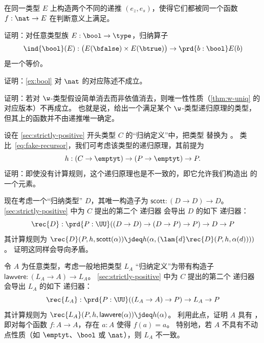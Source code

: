 \begin{ex}\label{ex:one-function-two-recurrences}
  在同一类型 $E$ 上构造两个不同的递推 $(e_z,e_s)$，使得它们都被同一个函数 $f:\nat\to E$ 在判断意义上满足。
\end{ex}

\begin{ex}\label{ex:bool}
  证明：对任意类型族 $E : \bool \to \type$，归纳算子
  \[ \ind{\bool}(E) : \big(E(\bfalse) \times E(\btrue)\big) \to \prd{b : \bool} E(b) \]
  是一个等价。
\end{ex}

\begin{ex}\label{ex:ind-nat-not-equiv}
  证明：\cref{ex:bool} 对 $\nat$ 的对应陈述不成立。
\end{ex}

\begin{ex}\label{ex:no-dep-uniqueness-failure}
  证明：若对 $\w$-类型假设简单消去而非依值消去，则唯一性性质（\cref{thm:w-uniq} 的对应版本）不再成立。
  也就是说，给出一个满足某个 $\w$-类型递归原理的类型，但其上的函数并不由递推唯一确定。
\end{ex}

\begin{ex}\label{ex:loop}
  设在 \cref{sec:strictly-positive} 开头类型 $C$ 的“归纳定义”中，把类型 \nat 替换为 \emptyt。
  类比~\eqref{eq:fake-recursor}，我们可考虑该类型的递归原理，其前提为
  \[ h:(C\to\emptyt) \to (P\to\emptyt) \to P. \]
  证明：即使没有计算规则，这个递归原理也是不一致的，即它允许我们构造出 \emptyt 的一个元素。
\end{ex}

\begin{ex}\label{ex:loop2}
  现在考虑一个“归纳类型” $D$，其唯一构造子为 $\mathsf{scott}:(D\to D) \to D$。
  \cref{sec:strictly-positive} 中为 $C$ 提出的第二个 递归器 会导出 $D$ 的如下 递归器：
  \[ \rec{D} : \prd{P:\UU} ((D\to D) \to (D\to P)\to P) \to D \to P \]
  其计算规则为 $\rec{D}(P,h,\mathsf{scott}(\alpha)) \jdeq h(\alpha,(\lam{d} \rec{D}(P,h,\alpha(d))))$。
  证明这同样会导向矛盾。
\end{ex}

\begin{ex}\label{ex:inductive-lawvere}
  令 $A$ 为任意类型，考虑一般地把类型 $L_A$ “归纳定义”为带有构造子 $\mathsf{lawvere}:(L_A\to A) \to L_A$。
  \cref{sec:strictly-positive} 中为 $C$ 提出的第二个 递归器 会导出 $L_A$ 的如下 递归器：
  \[ \rec{L_A} : \prd{P:\UU} ((L_A\to A) \to P) \to L_A\to P \]
  其计算规则为 $\rec{L_A}(P,h,\mathsf{lawvere}(\alpha)) \jdeq h(\alpha)$。
  利用此点，证明 $A$ 具有 ，即对每个函数 $f:A\to A$，存在 $a:A$ 使得 $f(a)=a$。
  特别地，若 $A$ 不具有不动点性质（如 $\emptyt$、$\bool$ 或 $\nat$），则 $L_A$ 不一致。
\end{ex}

